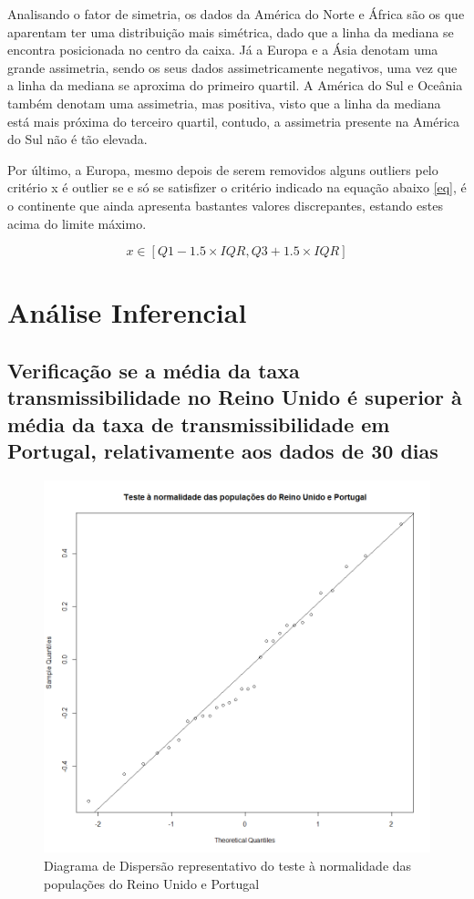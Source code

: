 \documentclass[conference]{IEEEtran}
\begin{document}
Analisando o fator de simetria, os dados da América do Norte e África são os que aparentam ter uma distribuição mais simétrica, dado que a linha da mediana se encontra posicionada no centro da caixa. Já a Europa e a Ásia denotam uma grande assimetria, sendo os seus dados assimetricamente negativos, uma vez que a linha da mediana se aproxima do primeiro quartil. A América do Sul e Oceânia também denotam uma assimetria, mas positiva, visto que a linha da mediana está mais próxima do terceiro quartil, contudo, a assimetria presente na América do Sul não é tão elevada.

Por último, a Europa, mesmo depois de serem removidos alguns outliers pelo critério x é outlier se e só se satisfizer o critério indicado na equação abaixo \eqref{eq}, é o continente que ainda apresenta bastantes valores discrepantes, estando estes acima do limite máximo.

\begin{equation}
x\in [Q1-1.5\times IQR, Q3+1.5\times IQR]\label{eq}
\end{equation}



\section{Análise Inferencial} %

\subsection{Verificação se a média da taxa transmissibilidade no Reino Unido é superior à média da taxa de transmissibilidade em Portugal, relativamente aos dados de 30 dias}

\begin{figure}[htbp]
\centerline{\includegraphics[width=0.95\columnwidth]{images/02.a.png}}
\caption{Diagrama de Dispersão representativo do teste à normalidade das populações do Reino Unido e Portugal}
\label{fig}
\end{figure}
\end{document}
